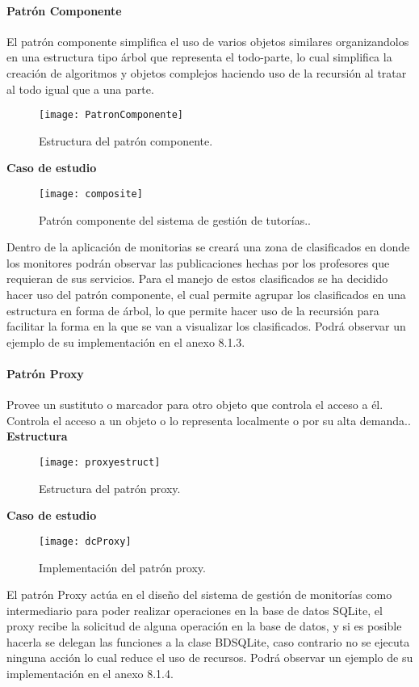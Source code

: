 \paragraph{Patrón Componente}
El patrón componente simplifica el uso de varios objetos similares organizandolos en una estructura tipo árbol que representa el todo-parte\cite{Bol_2014}, lo cual simplifica la creación de algoritmos y objetos complejos haciendo uso de la recursión al tratar al todo igual que a una parte.
\begin{figure}[H]
	\centering
	\texttt{[image: PatronComponente]}
    \centering
    \caption{Estructura del patrón componente.}
	\label{fig:eComponente}
\end{figure}
\indent\textbf{Caso de estudio}
\newline
\begin{figure}[H]
	\centering
	\texttt{[image: composite]}
    \centering
    \caption{Patrón componente del sistema de gestión de tutorías..}
	\label{fig:composite}
\end{figure}
\indent Dentro de la aplicación de monitorias se creará una zona de clasificados en donde los monitores podrán observar las publicaciones hechas por los profesores que requieran de sus servicios. Para el manejo de estos clasificados se ha decidido hacer uso del patrón componente, el cual permite agrupar los clasificados en una estructura en forma de árbol, lo que permite hacer uso de la recursión para facilitar la forma en la que se van a visualizar los clasificados. Podrá observar un ejemplo de su implementación en el anexo 8.1.3. 
\newpage
\paragraph{Patrón Proxy}
Provee un sustituto o marcador para otro objeto que controla el acceso a él. Controla el acceso a un objeto o lo representa localmente o por su alta demanda.\cite{Bol_2014}.
\newline
\indent\textbf{Estructura}
\newline
\begin{figure}[H]
	\centering
	\texttt{[image: proxyestruct]}
    \centering
    \caption{Estructura del patrón proxy.}
	\label{fig:eProxy}
\end{figure}
\indent\textbf{Caso de estudio}
\begin{figure}[H]
	\centering
	\texttt{[image: dcProxy]}
    \centering
    \caption{Implementación del patrón proxy.}
	\label{fig:dcProxy}
\end{figure}
\indent El patrón Proxy actúa en el diseño del sistema de gestión de monitorías como intermediario para poder realizar operaciones en la base de datos SQLite, el proxy recibe la solicitud de alguna operación en la base de datos, y si es posible hacerla se delegan las funciones a la clase BDSQLite, caso contrario no se ejecuta ninguna acción lo cual reduce el uso de recursos. Podrá observar un ejemplo de su implementación en el anexo 8.1.4.
\newpage

